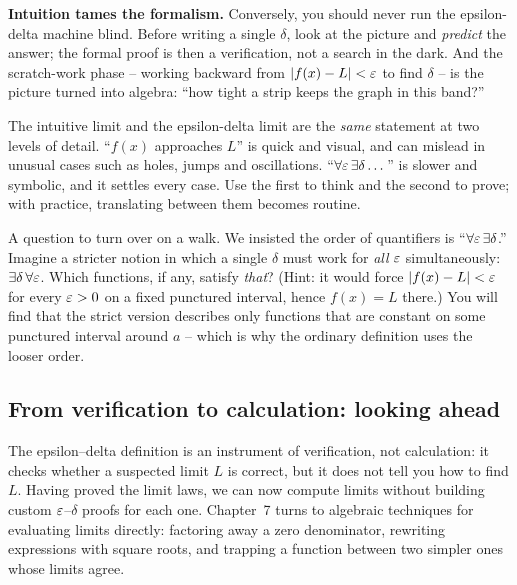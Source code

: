 \textbf{Intuition tames the formalism.} Conversely, you should never run the
epsilon-delta machine blind. Before writing a single $\delta$, look at the
picture and \emph{predict} the answer; the formal proof is then a verification,
not a search in the dark. And the scratch-work phase -- working backward from
$\lvert f(x)-L\rvert<\varepsilon$ to find $\delta$ -- is the picture turned into algebra:
``how tight a strip keeps the graph in this band?''

\begin{happeningbox}
The intuitive limit and the epsilon-delta limit are the \emph{same} statement
at two levels of detail. ``$f(x)$ approaches $L$'' is quick and visual, and can
mislead in unusual cases such as holes, jumps and oscillations.
``$\forall\varepsilon\,\exists\delta\dots$'' is slower and symbolic, and it settles every
case. Use the first to think and the second to prove; with practice,
translating between them becomes routine.
\end{happeningbox}

\begin{walkbox}
A question to turn over on a walk. We insisted the order of quantifiers is
``$\forall\varepsilon\,\exists\delta$.'' Imagine a stricter notion in which a single
$\delta$ must work for \emph{all} $\varepsilon$ simultaneously: $\exists\delta\,
\forall\varepsilon$. Which functions, if any, satisfy \emph{that}? (Hint: it would force
$\lvert f(x)-L\rvert<\varepsilon$ for every $\varepsilon>0$ on a fixed punctured interval, hence
$f(x)=L$ there.) You will find that the strict version describes only
functions that are constant on some punctured interval around $a$ -- which is
why the ordinary definition uses the looser order.
\end{walkbox}

\subsection{From verification to calculation: looking ahead}

The epsilon--delta definition is an instrument of verification, not calculation: it checks whether
a suspected limit $L$ is correct, but it does not tell you how to find $L$. Having proved the
limit laws, we can now compute limits without building custom $\varepsilon$--$\delta$ proofs for each one.
Chapter~7 turns to algebraic techniques for evaluating limits directly: factoring
away a zero denominator, rewriting expressions with square roots, and trapping
a function between two simpler ones whose limits agree.

